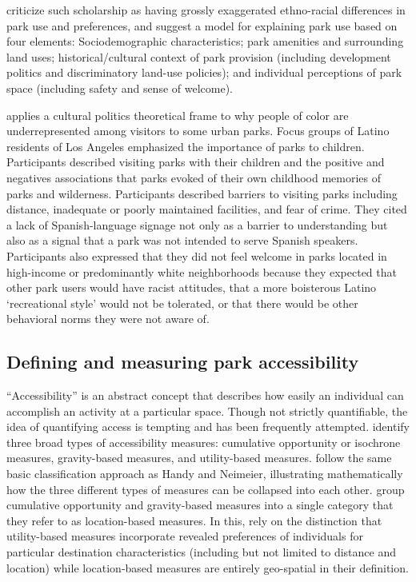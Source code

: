 \documentclass[3p, authoryear, review]{elsarticle} %
\begin{document}
\citet{byrne2009nature} criticize such scholarship as having grossly exaggerated
ethno-racial differences in park use and preferences, and suggest a model for
explaining park use based on four elements: Sociodemographic characteristics;
park amenities and surrounding land uses; historical/cultural context of park
provision (including development politics and discriminatory land-use
policies); and individual perceptions of park space (including safety and
sense of welcome).

\citet{byrne2012green} applies a cultural politics theoretical frame to why people of
color are underrepresented among visitors to some urban parks. Focus groups of
Latino residents of Los Angeles emphasized the importance of parks to
children. Participants described visiting parks with their children and the
positive and negatives associations that parks evoked of their own childhood
memories of parks and wilderness. Participants described barriers to visiting
parks including distance, inadequate or poorly maintained facilities, and fear
of crime. They cited a lack of Spanish-language signage not only as a barrier
to understanding but also as a signal that a park was not intended to serve
Spanish speakers. Participants also expressed that they did not feel welcome
in parks located in high-income or predominantly white neighborhoods because
they expected that other park users would have racist attitudes, that a more
boisterous Latino `recreational style' would not be tolerated, or that there
would be other behavioral norms they were not aware of.

\hypertarget{defining-and-measuring-park-accessibility}{%
\subsection{Defining and measuring park accessibility}\label{defining-and-measuring-park-accessibility}}

``Accessibility'' is an abstract concept that describes how easily an individual
can accomplish an activity at a particular space. Though not strictly
quantifiable, the idea of quantifying access is tempting and has been
frequently attempted. \citet{Handy1997} identify three broad types of accessibility
measures: cumulative opportunity or isochrone measures, gravity-based measures,
and utility-based measures. \citet{Dong2006} follow the same basic classification
approach as Handy and Neimeier, illustrating mathematically how the three
different types of measures can be collapsed into each other. \citet{GEURS2004127}
group cumulative opportunity and gravity-based measures into a single category
that they refer to as location-based measures. In this, \citet{GEURS2004127} rely on
the distinction that utility-based measures incorporate revealed preferences of
individuals for particular destination characteristics (including but not limited
to distance and location) while location-based measures are entirely geo-spatial
in their definition.
\end{document}
